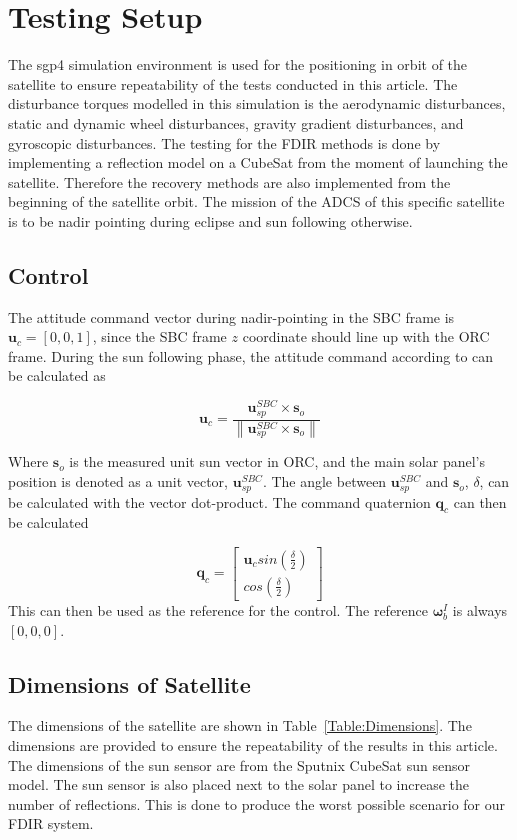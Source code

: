 \documentclass[letterpaper, 10 pt, conference]{ieeeconf}  %
\newcommand\norm[1]{\left\lVert#1\right\rVert}
\begin{document}
\section{Testing Setup}
The sgp4 simulation environment is used for the positioning in orbit of the satellite to ensure repeatability of the tests conducted in this article. The disturbance torques modelled in this simulation is the aerodynamic disturbances, static and dynamic wheel disturbances, gravity gradient disturbances, and gyroscopic disturbances. The testing for the FDIR methods is done by implementing a reflection model on a CubeSat from the moment of launching the satellite. Therefore the recovery methods are also implemented from the beginning of the satellite orbit. The mission of the ADCS of this specific satellite is to be nadir pointing during eclipse and sun following otherwise.

\subsection{Control}
The attitude command vector during nadir-pointing in the SBC frame is $\mathbf{u}_c = [0, 0, 1]$, since the SBC frame $z$ coordinate should line up with the ORC frame. During the sun following phase, the attitude command according to \textcite{chen2000ground} can be calculated as 

\begin{equation}
\mathbf{u}_c = \frac{\mathbf{u}_{sp}^{SBC} \times \mathbf{s}_o}{\norm{\mathbf{u}_{sp}^{SBC} \times \mathbf{s}_o}}
\end{equation}

Where $\mathbf{s}_o$ is the measured unit sun vector in ORC, and the main solar panel's position is denoted as a unit vector, $\mathbf{u}_{sp}^{SBC}$. The angle between $\mathbf{u}_{sp}^{SBC}$ and $\mathbf{s}_o$, $\delta$, can be calculated with the vector dot-product. The command quaternion $\mathbf{q}_c$ can then be calculated

\begin{equation}
\mathbf{q}_c = \begin{bmatrix}
\mathbf{u}_c sin(\frac{\delta}{2}) \\
cos(\frac{\delta}{2})
\end{bmatrix}
\end{equation}
This can then be used as the reference for the control. The reference $\boldsymbol{\omega}_b^I$ is always $[0, 0, 0]$. 

\subsection{Dimensions of Satellite}
The dimensions of the satellite are shown in Table~\ref{Table:Dimensions}. The dimensions are provided to ensure the repeatability of the results in this article. The dimensions of the sun sensor are from the Sputnix CubeSat sun sensor model. The sun sensor is also placed next to the solar panel to increase the number of reflections. This is done to produce the worst possible scenario for our FDIR system.
\end{document}

